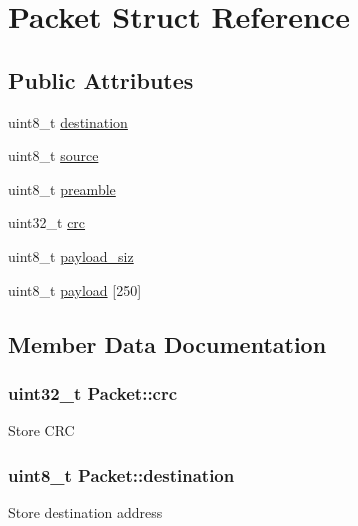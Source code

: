 \hypertarget{structPacket}{}\section{Packet Struct Reference}
\label{structPacket}
\subsection*{Public Attributes}
\begin{DoxyCompactItemize}
\item 
uint8\+\_\+t \hyperlink{structPacket_af626fe07d93fe4116d613304792df080}{destination}
\item 
uint8\+\_\+t \hyperlink{structPacket_a01308f5b690e5060fea6037e765058b9}{source}
\item 
uint8\+\_\+t \hyperlink{structPacket_aa305c88136c91911a5159610863cb41d}{preamble}
\item 
uint32\+\_\+t \hyperlink{structPacket_abad95795e9615463d9d69d298a86b0b8}{crc}
\item 
uint8\+\_\+t \hyperlink{structPacket_ab13014675ea9eda122b1c50842a567fc}{payload\+\_\+siz}
\item 
uint8\+\_\+t \hyperlink{structPacket_a58a48ac639979f488f254bbcb98e72b8}{payload} \mbox{[}250\mbox{]}
\end{DoxyCompactItemize}


\subsection{Member Data Documentation}
\subsubsection[{\texorpdfstring{crc}{crc}}]{\setlength{\rightskip}{0pt plus 5cm}uint32\+\_\+t Packet\+::crc}\hypertarget{structPacket_abad95795e9615463d9d69d298a86b0b8}{}\label{structPacket_abad95795e9615463d9d69d298a86b0b8}
Store C\+RC 
\subsubsection[{\texorpdfstring{destination}{destination}}]{\setlength{\rightskip}{0pt plus 5cm}uint8\+\_\+t Packet\+::destination}\hypertarget{structPacket_af626fe07d93fe4116d613304792df080}{}\label{structPacket_af626fe07d93fe4116d613304792df080}
Store destination address 
